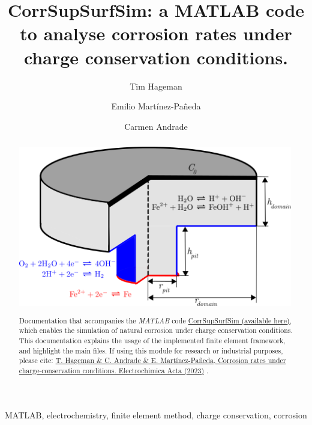 \documentclass[3p]{elsarticle} %
\newcommand{\citeMe}{\href{https://doi.org/10.1016/j.electacta.2023.142624}{T. Hageman \& C. Andrade \& E. Martínez-Pañeda, Corrosion rates under charge-conservation conditions. Electrochimica Acta (2023)} \citep{Hageman2023}}
\begin{document}
\begin{frontmatter}
\title{Corr\textunderscore Sup\textunderscore Surf\textunderscore Sim: a MATLAB code to analyse corrosion rates under charge conservation conditions.}

\author[1]{Tim Hageman }
\author[1]{Emilio Martínez-Pañeda}
\author[2]{Carmen Andrade}

\address[1]{Department of Civil and Environmental Engineering, Imperial College London, London SW7 2AZ, UK}
\address[2]{International Center of Numerical Methods in Engineering (CIMNE), Madrid 28010, Spain}

\begin{abstract}
\begin{center}
\includegraphics[width=12cm]{../Figures/Domain.png}
\end{center}
Documentation that accompanies the \textit{MATLAB} code \href{https://github.com/T-Hageman/Corr_Sup_Surf_Sim}{Corr\textunderscore Sup\textunderscore Surf\textunderscore Sim (available here)}, which enables the simulation of natural corrosion under charge conservation conditions. This documentation explains the usage of the implemented finite element framework, and highlight the main files. If using this module for research or industrial purposes, please cite: \citeMe{}.
\end{abstract}

\begin{keyword}
MATLAB, electrochemistry, finite element method, charge conservation, corrosion
\end{keyword}

\end{frontmatter}

\tableofcontents
\end{document}
